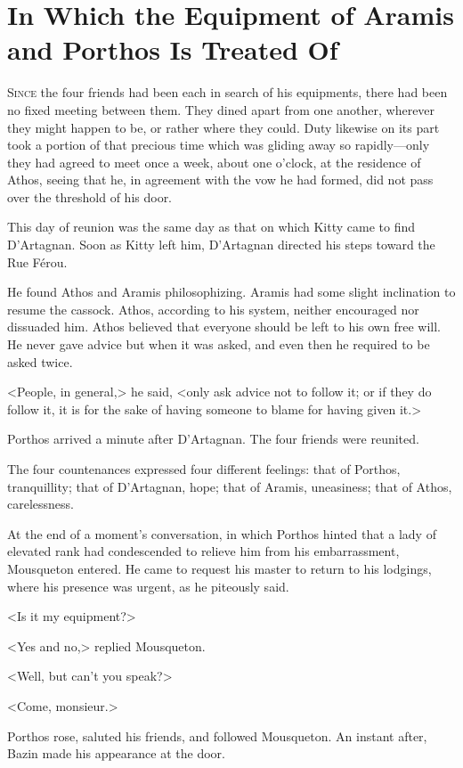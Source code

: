 
\chapter[The Equipment of Aramis and Porthos]{In Which the Equipment of Aramis and Porthos Is Treated Of}

\lettrine{S}{ince} the four friends had been each in search of his equipments, there had been no fixed meeting between them. They dined apart from one another, wherever they might happen to be, or rather where they could. Duty likewise on its part took a portion of that precious time which was gliding away so rapidly—only they had agreed to meet once a week, about one o'clock, at the residence of Athos, seeing that he, in agreement with the vow he had formed, did not pass over the threshold of his door. 

This day of reunion was the same day as that on which Kitty came to find D'Artagnan. Soon as Kitty left him, D'Artagnan directed his steps toward the Rue Férou. 

He found Athos and Aramis philosophizing. Aramis had some slight inclination to resume the cassock. Athos, according to his system, neither encouraged nor dissuaded him. Athos believed that everyone should be left to his own free will. He never gave advice but when it was asked, and even then he required to be asked twice. 

<People, in general,> he said, <only ask advice not to follow it; or if they do follow it, it is for the sake of having someone to blame for having given it.> 

Porthos arrived a minute after D'Artagnan. The four friends were reunited. 

The four countenances expressed four different feelings: that of Porthos, tranquillity; that of D'Artagnan, hope; that of Aramis, uneasiness; that of Athos, carelessness. 

At the end of a moment's conversation, in which Porthos hinted that a lady of elevated rank had condescended to relieve him from his embarrassment, Mousqueton entered. He came to request his master to return to his lodgings, where his presence was urgent, as he piteously said. 

<Is it my equipment?> 

<Yes and no,> replied Mousqueton. 

<Well, but can't you speak?> 

<Come, monsieur.> 

Porthos rose, saluted his friends, and followed Mousqueton. An instant after, Bazin made his appearance at the door. 

